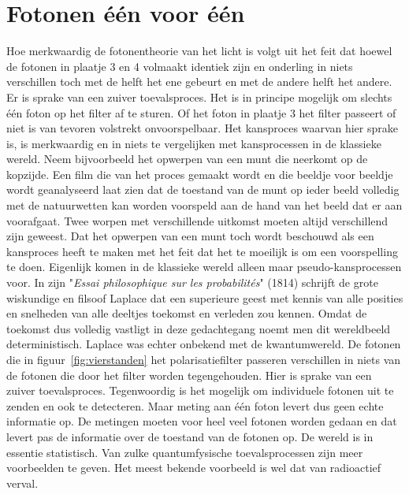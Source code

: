 \documentclass[../main.tex]{subfiles}
\begin{document}
\section{Fotonen \'e\'en voor \'e\'en}
Hoe merkwaardig de fotonentheorie van het licht is volgt uit het feit dat hoewel de fotonen in plaatje 3 en 4 volmaakt identiek zijn en onderling in niets verschillen toch met de helft het ene gebeurt en met de andere helft het andere. Er is sprake van een zuiver toevalsproces. 
Het is in principe mogelijk om slechts \'e\'en foton op het filter af te sturen. Of het foton in plaatje 3 het filter passeert of niet is van tevoren volstrekt onvoorspelbaar. Het kansproces waarvan hier sprake is, is merkwaardig en in niets te vergelijken met kansprocessen in de klassieke wereld. Neem bijvoorbeeld het opwerpen van een munt die neerkomt op de kopzijde. Een film die van het proces gemaakt wordt en die beeldje voor beeldje wordt geanalyseerd laat zien dat de toestand van de munt op ieder beeld volledig met de natuurwetten kan worden voorspeld aan de hand van het beeld dat er aan voorafgaat. Twee worpen met verschillende uitkomst moeten altijd verschillend zijn geweest. Dat het opwerpen van een munt toch wordt beschouwd als een kansproces heeft te maken met het feit dat het te moeilijk is om een voorspelling te doen. Eigenlijk komen in de klassieke wereld alleen maar pseudo-kansprocessen voor.
In zijn "\textit{Essai philosophique sur les probabilit\'es}" (1814) schrijft de grote wiskundige en filsoof Laplace dat een superieure geest met kennis van alle posities en snelheden van alle deeltjes toekomst en verleden zou kennen. Omdat de toekomst dus volledig vastligt in deze gedachtegang noemt men dit wereldbeeld deterministisch. 
Laplace was echter onbekend met de kwantumwereld. De fotonen die in figuur~\ref{fig:vierstanden} het polarisatiefilter passeren verschillen in niets van de fotonen die door het filter worden tegengehouden. Hier is sprake van een zuiver toevalsproces. Tegenwoordig is het mogelijk om individuele fotonen uit te zenden en ook te detecteren. Maar meting aan \'e\'en foton levert dus geen echte informatie op. De metingen moeten voor heel veel fotonen worden gedaan en dat levert pas de informatie over de toestand van de fotonen op. De wereld is in essentie statistisch.
Van zulke quantumfysische toevalsprocessen zijn meer voorbeelden te geven. Het meest bekende voorbeeld is wel dat van radioactief verval. 
\end{document}
